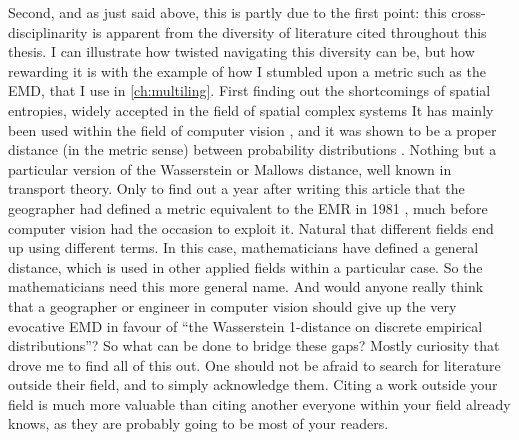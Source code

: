 \documentclass[../thesis.tex]{subfiles}
\begin{document}
Second, and as just said above, this is partly due to the first point: this
cross-disciplinarity is apparent from the diversity of literature cited throughout this
thesis. I can illustrate how twisted navigating this diversity can be, but how rewarding
it is with the example of how I stumbled upon a metric such as the \ac{EMD}, that I use
in \cref{ch:multiling}.
First finding out the shortcomings of spatial entropies, widely accepted in the field of
spatial complex systems \cite{BattyEntropyComplexity2014} It has mainly been used within
the field of computer vision \cite{RubnerMetricDistributions1998}, and it was shown to
be a proper distance (in the metric sense) between probability distributions
\cite{LevinaEarthMover2001}. Nothing but a particular version of the Wasserstein or
Mallows distance, well known in transport theory. Only to find out a year after writing
this article that the geographer
 had defined a metric equivalent
to the \ac{EMR} in 1981 \cite{JakubsDistancebasedSegregation1981}, much before computer
vision had the occasion to exploit it. Natural that different fields end up using
different terms. In this case, mathematicians have defined a general distance, which is
used in other applied fields within a particular case. So the mathematicians need this
more general name. And would anyone really think that a geographer or engineer in
computer vision should give up the very evocative \ac{EMD} in favour of ``the
Wasserstein 1-distance on discrete empirical distributions''? So what can be done to
bridge these gaps? Mostly curiosity that drove me to find all of this out. One should
not be afraid to search for literature outside their field, and to simply acknowledge
them. Citing a work outside your field is much more valuable than citing another
everyone within your field already knows, as they are probably going to be most of your
readers.
\end{document}
